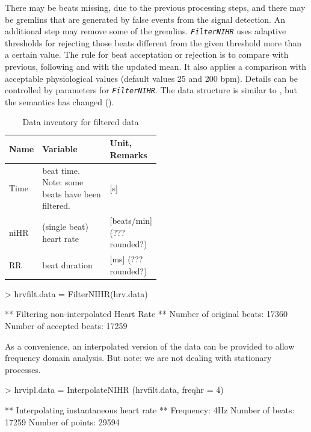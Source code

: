 \documentclass[a4paper, english, utf8]{amsart}
\newcommand\code[1]{\textsl{\texttt{#1}}}
\begin{document}
There may be beats missing, due to the previous processing steps, and there may be gremlins that are 
generated by false events from the signal detection. An additional step may remove  some of the gremlins. 
\code{FilterNIHR} uses adaptive thresholds for rejecting those beats different from the given threshold 
more than a certain value. The rule for beat acceptation or rejection is to compare with previous, following 
and with the updated mean. It also applies a comparison with acceptable physiological values (default 
values 25 and 200 bpm). Details can be controlled by parameters for \code{FilterNIHR}. The data 
structure is similar to  , 
but the semantics has changed ().

\begin{table}
\begin{center}
\begin{tabular}{|l|p{0.5\linewidth}|l|}
\hline
\rowcolor[gray]{0.8}%
Name&Variable&Unit, Remarks\\
\hline
Time&beat time. Note: some beats have been filtered.&[s]\\
niHR&(single beat) heart rate&[beats/min] (??? rounded?)\\
RR&beat duration&[ms]  (??? rounded?)\\
\hline
\end{tabular}
\end{center}
\caption{Data inventory for filtered data}\label{tab:inventoryfilt}
\end{table}

\begin{Schunk}
\begin{Sinput}
> hrvfilt.data = FilterNIHR(hrv.data)
\end{Sinput}
\begin{Soutput}
** Filtering non-interpolated Heart Rate **
   Number of original beats: 17360 
   Number of accepted beats: 17259 
\end{Soutput}
\end{Schunk}

As a convenience, an interpolated version of the data can be provided to allow frequency domain analysis. But note: we are not dealing with stationary processes.

\begin{Schunk}
\begin{Sinput}
> hrvipl.data = InterpolateNIHR (hrvfilt.data, freqhr = 4)
\end{Sinput}
\begin{Soutput}
** Interpolating instantaneous heart rate **
   Frequency: 4Hz
   Number of beats: 17259 
   Number of points: 29594 
\end{Soutput}
\end{Schunk}
\end{document}
